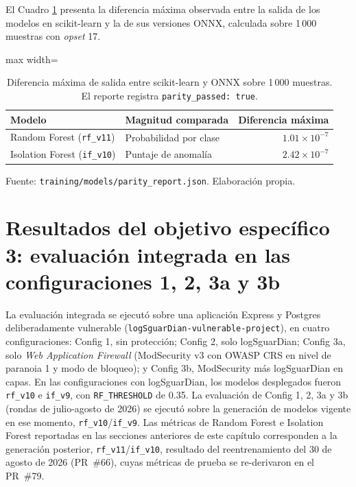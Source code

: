 El Cuadro \ref{tabla:res-paridad} presenta la diferencia máxima observada entre la salida de los modelos en scikit-learn y la de sus versiones ONNX, calculada sobre 1\,000 muestras con \textit{opset} 17.

\begin{table}[htbp]
\centering
\footnotesize
\setlength{\tabcolsep}{3pt}
\begin{adjustbox}{max width=\linewidth}
\begin{tabular}{|l|l|r|}
\hline
\textbf{Modelo} & \textbf{Magnitud comparada} & \textbf{Diferencia máxima} \\ \hline
Random Forest (\texttt{rf\_v11}) & Probabilidad por clase & $1.01 \times 10^{-7}$ \\ \hline
Isolation Forest (\texttt{if\_v10}) & Puntaje de anomalía & $2.42 \times 10^{-7}$ \\ \hline
\end{tabular}
\end{adjustbox}
\caption{Diferencia máxima de salida entre scikit-learn y ONNX sobre 1\,000 muestras. El reporte registra \texttt{parity\_passed: true}.}
\label{tabla:res-paridad}
\par\smallskip\footnotesize Fuente: \texttt{training/models/parity\_report.json}. Elaboración propia.
\end{table}

\section{Resultados del objetivo específico 3: evaluación integrada en las configuraciones 1, 2, 3a y 3b}

La evaluación integrada se ejecutó sobre una aplicación Express y Postgres deliberadamente vulnerable (\texttt{logSguarDian-vulnerable-project}), en cuatro configuraciones: Config 1, sin protección; Config 2, solo logSguarDian; Config 3a, solo \textit{Web Application Firewall} (ModSecurity v3 con OWASP CRS en nivel de paranoia 1 y modo de bloqueo); y Config 3b, ModSecurity más logSguarDian en capas. En las configuraciones con logSguarDian, los modelos desplegados fueron \texttt{rf\_v10} e \texttt{if\_v9}, con \texttt{RF\_THRESHOLD} de 0.35. La evaluación de Config 1, 2, 3a y 3b (rondas de julio-agosto de 2026) se ejecutó sobre la generación de modelos vigente en ese momento, \texttt{rf\_v10}/\texttt{if\_v9}. Las métricas de Random Forest e Isolation Forest reportadas en las secciones anteriores de este capítulo corresponden a la generación posterior, \texttt{rf\_v11}/\texttt{if\_v10}, resultado del reentrenamiento del 30 de agosto de 2026 (PR~\#66), cuyas métricas de prueba se re-derivaron en el PR~\#79.

